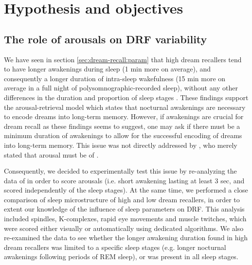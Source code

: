 \cleardoublepage

\chapter{Hypothesis and objectives}
\label{sec:problematic}


\section{The role of arousals on DRF variability}
\label{sec:problematic:arousals}

We have seen in section \ref{sec:dream-recall:param} that high dream recallers tend to have longer awakenings during sleep (1 min more on average), and consequently a longer duration of intra-sleep wakefulness (15 min more on average in a full night of polysomnographic-recorded sleep), without any other differences in the duration and proportion of sleep stages \citep{eichenlaub_brain_2014}. These findings support the arousal-retrieval model which states that nocturnal awakenings are necessary to encode dreams into long-term memory. However, if awakenings are crucial for dream recall as these findings seems to suggest, one may ask if there must be a minimum duration of awakenings to allow for the successful encoding of dreams into long-term memory. This issue was not directly addressed by \citet{koulack_dream_1976}, who merely stated that arousal must be of .

Consequently, we decided to experimentally test this issue by re-analyzing the data of \citet{eichenlaub_brain_2014} in order to score arousals (i.e. short awakening lasting at least 3 sec, and scored independently of the sleep stages). At the same time, we performed a close comparison of sleep microstructure of high and low dream recallers, in order to extent our knowledge of the influence of sleep parameters on DRF. This analysis included spindles, K-complexes, rapid eye movements and muscle twitches, which were  scored either visually or automatically using dedicated algorithms. We also re-examined the data to see whether the longer awakening duration found in high dream recallers was limited to a specific sleep stages (e.g. longer nocturnal awakenings following periods of REM sleep), or was present in all sleep stages.

